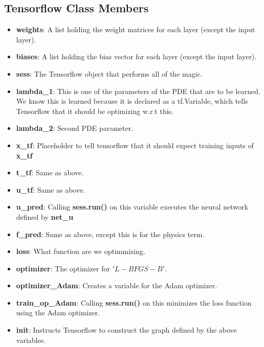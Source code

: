 \documentclass[10pt]{article}
\begin{document}
\subsection{Tensorflow Class Members}

\begin{itemize}
    \item \textbf{weights}: A list holding the weight matrices for each layer (except the input layer).
	\item \textbf{biases}: A list holding the bias vector for each layer (except the input layer).
	\item \textbf{sess}: The Tensorflow object that performs all of the magic.
    \item \textbf{lambda\_1}: This is one of the parameters of the PDE that are to be learned. We know this is learned because it is declared as a tf.Variable, which tells Tensorflow that it should be optimizing w.r.t this.
    \item \textbf{lambda\_2}: Second PDE parameter.
    \item \textbf{x\_tf}: Placeholder to tell tensorflow that it should expect training inputs of \textbf{x\_tf}
	\item \textbf{t\_tf}: Same as above.
	\item \textbf{u\_tf}: Same as above.
	\item \textbf{u\_pred}: Calling \textbf{sess.run()} on this variable executes the neural network defined by \textbf{net\_u}
	\item \textbf{f\_pred}: Same as above, except this is for the physics term. 
	\item \textbf{loss}: What function are we optimmizing.
	\item \textbf{optimizer}: The optimizer for $'L-BFGS-B'$. 
    \item \textbf{optimizer\_Adam}: Creates a variable for the Adam optimizer.
    \item \textbf{train\_op\_Adam}: Calling \textbf{sess.run()} on this minimizes the loss function using the Adam optimizer.  
	\item \textbf{init}: Instructs Tensorflow to construct the graph defined by the above variables.
\end{itemize}	
\end{document}
